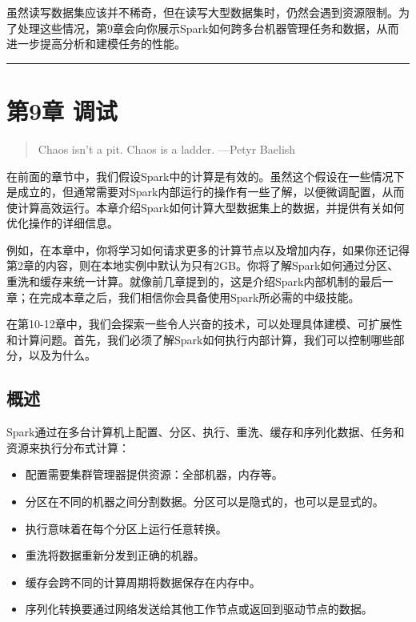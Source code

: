 \documentclass[
]{article}
\providecommand{\tightlist}{%
  \setlength{\itemsep}{0pt}\setlength{\parskip}{0pt}}
\begin{document}
虽然读写数据集应该并不稀奇，但在读写大型数据集时，仍然会遇到资源限制。为了处理这些情况，第9章会向你展示Spark如何跨多台机器管理任务和数据，从而进一步提高分析和建模任务的性能。

\begin{center}\rule{0.5\linewidth}{\linethickness}\end{center}

\hypertarget{ux7b2c9ux7ae0-ux8c03ux8bd5}{%
\section{第9章 调试}\label{ux7b2c9ux7ae0-ux8c03ux8bd5}}

\begin{quote}
Chaos isn't a pit. Chaos is a ladder. ---Petyr Baelish
\end{quote}

在前面的章节中，我们假设Spark中的计算是有效的。虽然这个假设在一些情况下是成立的，但通常需要对Spark内部运行的操作有一些了解，以便微调配置，从而使计算高效运行。本章介绍Spark如何计算大型数据集上的数据，并提供有关如何优化操作的详细信息。

例如，在本章中，你将学习如何请求更多的计算节点以及增加内存，如果你还记得第2章的内容，则在本地实例中默认为只有2GB。你将了解Spark如何通过分区、重洗和缓存来统一计算。就像前几章提到的，这是介绍Spark内部机制的最后一章；在完成本章之后，我们相信你会具备使用Spark所必需的中级技能。

在第10-12章中，我们会探索一些令人兴奋的技术，可以处理具体建模、可扩展性和计算问题。首先，我们必须了解Spark如何执行内部计算，我们可以控制哪些部分，以及为什么。

\hypertarget{ux6982ux8ff0-8}{%
\subsection{概述}\label{ux6982ux8ff0-8}}

Spark通过在多台计算机上配置、分区、执行、重洗、缓存和序列化数据、任务和资源来执行分布式计算：

\begin{itemize}
\tightlist
\item
  配置需要集群管理器提供资源：全部机器，内存等。
\item
  分区在不同的机器之间分割数据。分区可以是隐式的，也可以是显式的。
\item
  执行意味着在每个分区上运行任意转换。
\item
  重洗将数据重新分发到正确的机器。
\item
  缓存会跨不同的计算周期将数据保存在内存中。
\item
  序列化转换要通过网络发送给其他工作节点或返回到驱动节点的数据。
\end{itemize}
\end{document}
